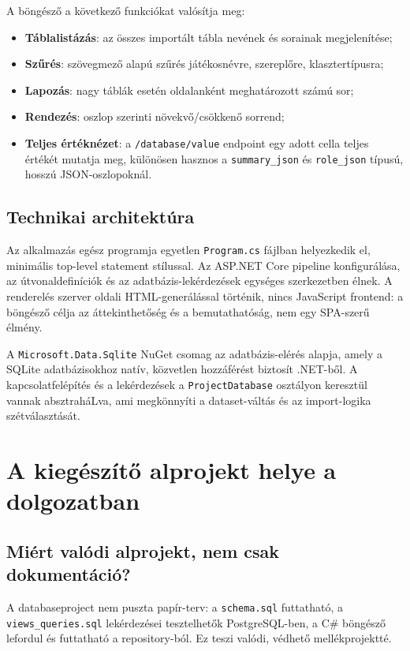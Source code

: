 ﻿\documentclass[a4paper,12pt]{report}
\begin{document}
A böngésző a következő funkciókat valósítja meg:

\begin{itemize}
    \item \textbf{Táblalistázás}: az összes importált tábla nevének és sorainak megjelenítése;
    \item \textbf{Szűrés}: szövegmező alapú szűrés játékosnévre, szereplőre, klasztertípusra;
    \item \textbf{Lapozás}: nagy táblák esetén oldalanként meghatározott számú sor;
    \item \textbf{Rendezés}: oszlop szerinti növekvő/csökkenő sorrend;
    \item \textbf{Teljes értéknézet}: a \texttt{/database/value} endpoint egy adott cella teljes értékét mutatja meg, különösen hasznos a \texttt{summary\_json} és \texttt{role\_json} típusú, hosszú JSON-oszlopoknál.
\end{itemize}

\subsection{Technikai architektúra}

Az alkalmazás egész programja egyetlen \texttt{Program.cs} fájlban helyezkedik el, minimális top-level statement stílussal. Az ASP.NET Core pipeline konfigurálása, az útvonaldefiníciók és az adatbázis-lekérdezések egységes szerkezetben élnek. A renderelés szerver oldali HTML-generálással történik, nincs JavaScript frontend: a böngésző célja az áttekinthetőség és a bemutathatóság, nem egy SPA-szerű élmény.

A \texttt{Microsoft.Data.Sqlite} NuGet csomag az adatbázis-elérés alapja, amely a SQLite adatbázisokhoz natív, közvetlen hozzáférést biztosít .NET-ből. A kapcsolatfelépítés és a lekérdezések a \texttt{ProjectDatabase} osztályon keresztül vannak absztraháLva, ami megkönnyíti a dataset-váltás és az import-logika szétválasztását.

\section{A kiegészítő alprojekt helye a dolgozatban}

\subsection{Miért valódi alprojekt, nem csak dokumentáció?}

A databaseproject nem puszta papír-terv: a \texttt{schema.sql} futtatható, a \texttt{views\_queries.sql} lekérdezései tesztelhetők PostgreSQL-ben, a C\# böngésző lefordul és futtatható a repository-ból. Ez teszi valódi, védhető mellékprojektté.
\end{document}
